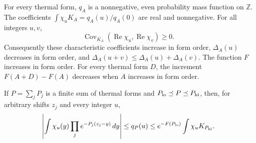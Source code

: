 \begin{lemma}\label{lemma:thermal-monotonicity}
For every thermal form, $q_A$ is a nonnegative, even probability mass
function on $\mathbb Z$.  The coefficients
$\int\chi_uK_A=q_A(u)/q_A(0)$ are real and nonnegative.  For all integers
$u,v$,
\[
 \operatorname{Cov}_{K_A}(\operatorname{Re}\chi_u,
                          \operatorname{Re}\chi_v)\ge0.
\]
Consequently these characteristic coefficients increase in form order,
$\Delta_A(u)$ decreases in form order, and
$\Delta_A(u+v)\le\Delta_A(u)+\Delta_A(v)$.  The function $F$ increases in
form order.  For every thermal form $D$, the increment
$F(A+D)-F(A)$ decreases when $A$ increases in form order.

If $P=\sum_jP_j$ is a finite sum of thermal forms and
$P_{\rm lo}\preceq P\preceq P_{\rm hi}$, then, for
arbitrary shifts $z_j$ and every integer $u$,
\begin{equation}\label{eq:thermal-envelope}
 \left|\int\chi_u(y)\prod_j e^{-P_j(z_j-y)}\,dy\right|
 \le q_P(u)
 \le e^{-F(P_{\rm lo})}\int\chi_u K_{P_{\rm hi}}.
\end{equation}
\end{lemma}

